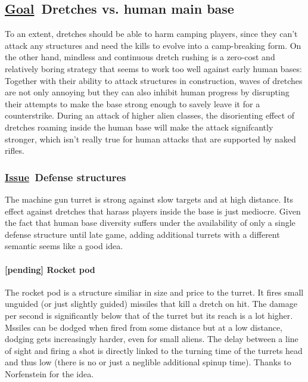 \documentclass{scrartcl}
\newcommand{\goal}     [0]{\textbf{\underline{Goal}\ }}
\newcommand{\issue}    [0]{\textbf{\underline{Issue}\ }}
\newcommand{\pending}  [0]{\textcolor{pending}  {\textbf{[pending] }}}
\begin{document}
\subsection{\goal Dretches vs. human main base}

To an extent, dretches should be able to harm camping players, since they can't attack any structures and need the kills to evolve into a camp-breaking form. On the other hand, mindless and continuous dretch rushing is a zero-cost and relatively boring strategy that seems to work too well against early human bases: Together with their ability to attack structures in construction, waves of dretches are not only annoying but they can also inhibit human progress by disrupting their attempts to make the base strong enough to savely leave it for a counterstrike. During an attack of higher alien classes, the disorienting effect of dretches roaming inside the human base will make the attack signifcantly stronger, which isn't really true for human attacks that are supported by naked rifles.

\subsubsection{\issue Defense structures}

The machine gun turret is strong against slow targets and at high distance. Its effect against dretches that harass players inside the base is just mediocre. Given the fact that human base diversity suffers under the availability of only a single defense structure until late game, adding additional turrets with a different semantic seems like a good idea.

\paragraph{\pending Rocket pod}

The rocket pod is a structure similiar in size and price to the turret. It fires small unguided (or just slightly guided) missiles that kill a dretch on hit. The damage per second is significantly below that of the turret but its reach is a lot higher. Mssiles can be dodged when fired from some distance but at a low distance, dodging gets increasingly harder, even for small aliens. The delay between a line of sight and firing a shot is directly linked to the turning time of the turrets head and thus low (there is no or just a neglible additional spinup time). Thanks to Norfenstein for the idea.
\end{document}
